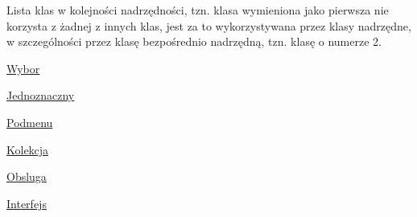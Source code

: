 Lista klas w kolejności nadrzędności, tzn. klasa wymieniona jako pierwsza nie korzysta z żadnej z innych klas, jest za to wykorzystywana przez klasy nadrzędne, w szczególności przez klasę bezpośrednio nadrzędną, tzn. klasę o numerze 2.


\begin{DoxyEnumerate}
\item \hyperlink{classWybor}{Wybor}
\begin{DoxyItemize}
\item \hyperlink{classJednoznaczny}{Jednoznaczny}
\item \hyperlink{classPodmenu}{Podmenu}
\end{DoxyItemize}
\item \hyperlink{classKolekcja}{Kolekcja}
\item \hyperlink{classObsluga}{Obsluga}
\item \hyperlink{classInterfejs}{Interfejs} 
\end{DoxyEnumerate}